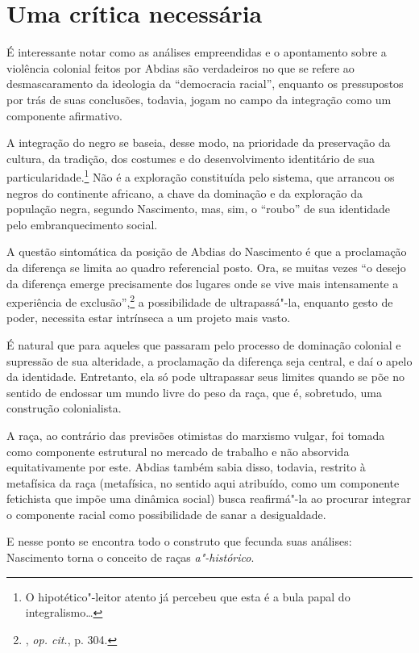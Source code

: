 \chapter{Uma crítica necessária}

É interessante notar como as análises empreendidas e o apontamento sobre
a violência colonial feitos por Abdias são verdadeiros no que se refere
ao desmascaramento da ideologia da ``democracia racial'', enquanto os
pressupostos por trás de suas conclusões, todavia, jogam no campo da
integração como um componente afirmativo.

A integração do negro se baseia, desse modo, na prioridade da
preservação da cultura, da tradição, dos costumes e do desenvolvimento
identitário de sua particularidade.\footnote{O hipotético"-leitor atento
  já percebeu que esta é a bula papal do integralismo\ldots{}} Não é a
exploração constituída pelo sistema, que arrancou os negros do
continente africano, a chave da dominação e da exploração da população
negra, segundo Nascimento, mas, sim, o ``roubo'' de sua identidade pelo
embranquecimento social.

A questão sintomática da posição de Abdias do Nascimento é que a
proclamação da diferença se limita ao quadro referencial posto. Ora, se
muitas vezes ``o desejo da diferença emerge precisamente dos lugares
onde se vive mais intensamente a experiência de exclusão'',\footnote{,
  \emph{op. cit.}, p. 304.} a possibilidade de ultrapassá"-la, enquanto gesto de
poder, necessita estar intrínseca a um projeto mais vasto.

É natural que para aqueles que passaram pelo processo de dominação
colonial e supressão de sua alteridade, a proclamação da diferença seja
central, e daí o apelo da identidade. Entretanto, ela só pode
ultrapassar seus limites quando se põe no sentido de endossar um mundo
livre do peso da raça, que é, sobretudo, uma construção colonialista.

A raça, ao contrário das previsões otimistas do marxismo vulgar, foi
tomada como componente estrutural no mercado de trabalho e não absorvida
equitativamente por este. Abdias também sabia disso, todavia, restrito à
metafísica da raça (metafísica, no sentido aqui atribuído, como um
componente fetichista que impõe uma dinâmica social) busca reafirmá"-la
ao procurar integrar o componente racial como possibilidade de sanar a
desigualdade.

E nesse ponto se encontra todo o construto que fecunda suas análises:
Nascimento torna o conceito de raças \emph{a"-histórico}.

